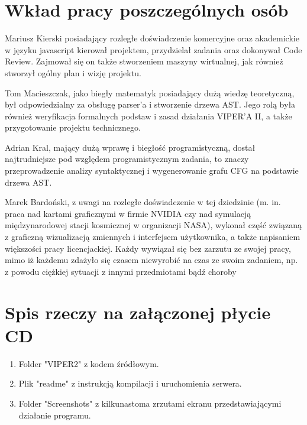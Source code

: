 \documentclass[a4paper,twoside,openright,11pt]{report}
\begin{document}
  \chapter {Wkład pracy poszczególnych osób}
\par Mariusz Kierski posiadający rozległe doświadczenie komercyjne oraz akademickie w języku javascript kierował projektem, przydzielał zadania oraz dokonywał Code Review. Zajmował się on także stworzeniem maszyny wirtualnej, jak również stworzył ogólny plan i wizję projektu.
\par Tom Macieszczak, jako biegły matematyk posiadający dużą wiedzę teoretyczną, był odpowiedzialny za obsługę parser'a i stworzenie drzewa AST. Jego rolą była również weryfikacja formalnych podstaw i zasad działania VIPER'A II, a także przygotowanie projektu technicznego.
\par Adrian Kral, mający dużą wprawę i biegłość programistyczną, dostał najtrudniejsze pod względem programistycznym zadania, to znaczy przeprowadzenie analizy syntaktycznej i wygenerowanie grafu CFG na podstawie drzewa AST.  
\par Marek Bardoński, z uwagi na rozległe doświadczenie w tej dziedzinie (m. in. praca nad kartami graficznymi w firmie NVIDIA czy nad symulacją międzynarodowej stacji kosmicznej w organizacji NASA), wykonał część związaną z graficzną wizualizacją zmiennych i interfejsem użytkownika, a także napisaniem większości pracy licencjackiej.
Każdy wywiązał się bez zarzutu ze swojej pracy, mimo iż każdemu zdażyło się czasem niewyrobić na czas ze swoim zadaniem, np. z powodu ciężkiej sytuacji z innymi przedmiotami bądź choroby

  \chapter {Spis rzeczy na załączonej płycie CD}
  \begin {enumerate}
    \item Folder "VIPER2" z kodem źródłowym.
    \item Plik "readme" z instrukcją kompilacji i uruchomienia serwera.
    \item Folder "Screenshots" z kilkunastoma zrzutami ekranu przedstawiającymi działanie programu.
  \end {enumerate}
\end{document}
